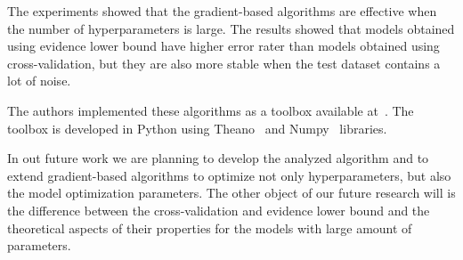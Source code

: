 \documentclass[smallextended]{svjour3}
\begin{document}
The experiments showed that the gradient-based algorithms are effective when the number of hyperparameters is large. The results showed that models obtained using evidence lower bound have higher error rater than models obtained using cross-validation, but they are also more stable when the test dataset contains a lot of noise. 

The authors  implemented these algorithms as a toolbox available at~\cite{pyfos}. The toolbox is developed in Python using Theano~\cite{theano} and Numpy~\cite{numpy} libraries. 

In out future work we are planning to develop the analyzed algorithm and to extend gradient-based algorithms to optimize not only hyperparameters, but also the model optimization parameters. The other object of our future research will is the difference between the cross-validation and evidence lower bound and the theoretical aspects of their properties for the models with large amount of parameters.


%

\end{document}
